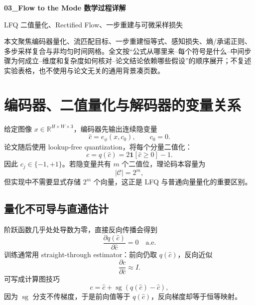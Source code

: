 \documentclass[UTF8,12pt,a4paper,fontset=none]{ctexart}
\numberwithin{equation}{section}
\newcommand{\R}{\mathbb{R}}
\newcommand{\sg}{\operatorname{sg}}
\begin{document}
\begin{center}
{\LARGE\bfseries 03\_Flow to the Mode 数学过程详解}\par
\vspace{0.35em}
{\large LFQ 二值量化、Rectified Flow、一步重建与可微采样损失}
\end{center}
\vspace{0.45em}
\begin{keybox}[本文只处理真正需要推导的部分]
本文聚焦编码器量化、流匹配目标、一步重建恒等式、感知损失、熵/承诺正则、多步采样复合与非均匀时间网格。全文按“公式从哪里来--每个符号是什么--中间步骤为何成立--维度和复杂度如何核对--论文结论依赖哪些假设”的顺序展开；不复述实验表格，也不使用与论文无关的通用背景凑页数。
\end{keybox}
\tableofcontents
\newpage

\section{编码器、二值量化与解码器的变量关系}
给定图像 $x\in\R^{H\times W\times3}$，编码器先输出连续隐变量
\begin{equation}
 \hat c=e_\phi(x,c_0),\qquad c_0=0.
\end{equation}
论文随后使用 lookup-free quantization，将每个分量二值化：
\begin{equation}
 \boxed{c=q(\hat c)=2\mathbf{1}[\hat c\ge0]-1.}
\end{equation}
因此 $c_j\in\{-1,+1\}$。若隐变量共有 $m$ 个二值位，理论码本容量为
\begin{equation}
 |\mathcal C|=2^m,
\end{equation}
但实现中不需要显式存储 $2^m$ 个向量，这正是 LFQ 与普通向量量化的重要区别。

\subsection{量化不可导与直通估计}
阶跃函数几乎处处导数为零，直接反向传播会得到
\begin{equation}
 \frac{\partial q(\hat c)}{\partial \hat c}=0\quad\text{a.e.}
\end{equation}
训练通常用 straight-through estimator：前向仍取 $q(\hat c)$，反向近似
\begin{equation}
 \frac{\partial c}{\partial\hat c}\approx I.
\end{equation}
可写成计算图技巧
\begin{equation}
 c=\hat c+\sg\!\left(q(\hat c)-\hat c\right),
\end{equation}
因为 $\sg$ 分支不传梯度，于是前向值等于 $q(\hat c)$，反向梯度却等于恒等映射。
\end{document}
